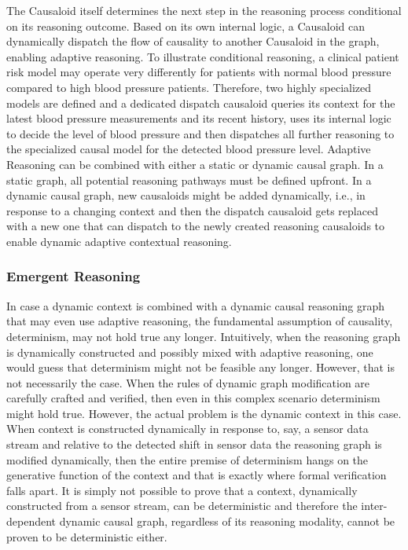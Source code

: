 The Causaloid itself determines the next step in the reasoning process conditional on its reasoning outcome. Based on its own internal logic, a Causaloid can dynamically dispatch the flow of causality to another Causaloid in the graph, enabling adaptive reasoning. To illustrate conditional reasoning, a clinical patient risk model may operate very differently for patients with normal blood pressure compared to high blood pressure patients. Therefore, two highly specialized models are defined and a dedicated dispatch causaloid queries its context for the latest blood pressure measurements and its recent history, uses its internal logic to decide the level of blood pressure and then dispatches all further reasoning to the specialized causal model for the detected blood pressure level. Adaptive Reasoning can be combined with either a static or dynamic causal graph. In a static graph, all potential reasoning pathways must be defined upfront. In a dynamic causal graph, new causaloids might be added dynamically, i.e., in response to a changing context and then the dispatch causaloid gets replaced with a new one that can dispatch to the newly created reasoning causaloids to enable dynamic adaptive contextual reasoning.  

\subsubsection{Emergent Reasoning}

In case a dynamic context is combined with a dynamic causal reasoning graph that may even use adaptive reasoning, the fundamental assumption of causality, determinism, may not hold true any longer. Intuitively, when the reasoning graph is dynamically constructed and possibly mixed with adaptive reasoning, one would guess that determinism might not be feasible any longer. However, that is not necessarily the case. When the rules of dynamic graph modification are carefully crafted and verified, then even in this complex scenario determinism might hold true. However, the actual problem is the dynamic context in this case. When context is constructed dynamically in response to, say, a sensor data stream and relative to the detected shift in sensor data the reasoning graph is modified dynamically, then the entire premise of determinism hangs on the generative function of the context and that is exactly where formal verification falls apart. It is simply not possible to prove that a context, dynamically constructed from a sensor stream, can be deterministic and therefore the inter-dependent dynamic causal graph, regardless of its reasoning modality, cannot be proven to be deterministic either. 

